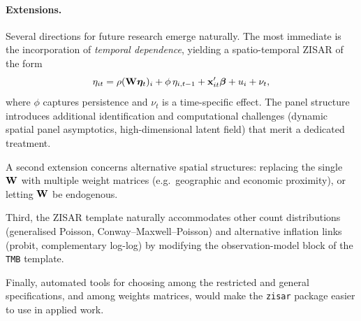 \paragraph{Extensions.}
Several directions for future research emerge naturally.
The most immediate is the incorporation of \emph{temporal dependence}, yielding a spatio-temporal ZISAR of the form
\[
  \eta_{it} = \rho(\mathbf{W}\boldsymbol{\eta}_t)_i + \phi\,\eta_{i,t-1} + \mathbf{x}_{it}'\boldsymbol{\beta} + u_i + \nu_t,
\]
where $\phi$ captures persistence and $\nu_t$ is a time-specific effect.
The panel structure introduces additional identification and computational challenges (dynamic spatial panel asymptotics, high-dimensional latent field) that merit a dedicated treatment.

A second extension concerns alternative spatial structures: replacing the single $\mathbf{W}$ with multiple weight matrices (e.g.\ geographic and economic proximity), or letting $\mathbf{W}$ be endogenous.

Third, the ZISAR template naturally accommodates other count distributions (generalised Poisson, Conway--Maxwell--Poisson) and alternative inflation links (probit, complementary log-log) by modifying the observation-model block of the \texttt{TMB} template.

Finally, automated tools for choosing among the restricted and general specifications, and among weights matrices, would make the \texttt{zisar} package \citep{zisar_pkg} easier to use in applied work.
